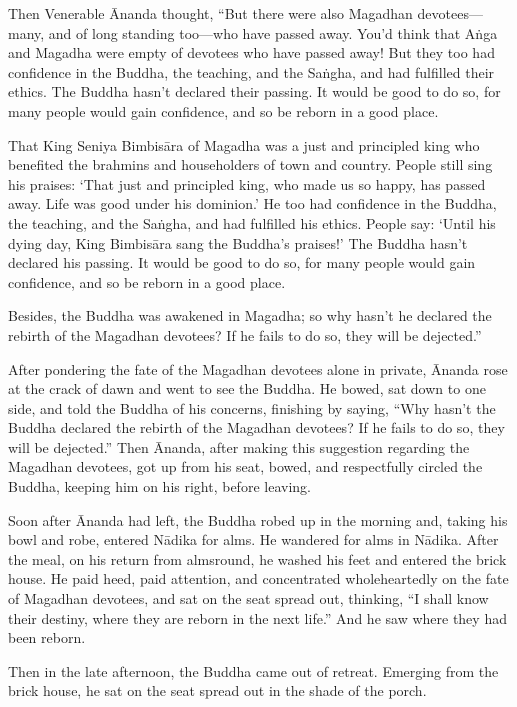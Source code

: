 \documentclass[12pt,openany]{book}%
\begin{document}
Then Venerable Ānanda thought, “But there were also Magadhan devotees—many, and of long standing too—who have passed away. You’d think that \textsanskrit{Aṅga} and Magadha were empty of devotees who have passed away! But they too had confidence in the Buddha, the teaching, and the \textsanskrit{Saṅgha}, and had fulfilled their ethics. The Buddha hasn’t declared their passing. It would be good to do so, for many people would gain confidence, and so be reborn in a good place. 

That King Seniya \textsanskrit{Bimbisāra} of Magadha was a just and principled king who benefited the brahmins and householders of town and country. People still sing his praises: ‘That just and principled king, who made us so happy, has passed away. Life was good under his dominion.’ He too had confidence in the Buddha, the teaching, and the \textsanskrit{Saṅgha}, and had fulfilled his ethics. People say: ‘Until his dying day, King \textsanskrit{Bimbisāra} sang the Buddha’s praises!’ The Buddha hasn’t declared his passing. It would be good to do so, for many people would gain confidence, and so be reborn in a good place. 

Besides, the Buddha was awakened in Magadha; so why hasn’t he declared the rebirth of the Magadhan devotees? If he fails to do so, they will be dejected.” 

After pondering the fate of the Magadhan devotees alone in private, Ānanda rose at the crack of dawn and went to see the Buddha. He bowed, sat down to one side, and told the Buddha of his concerns, finishing by saying, “Why hasn’t the Buddha declared the rebirth of the Magadhan devotees? If he fails to do so, they will be dejected.” Then Ānanda, after making this suggestion regarding the Magadhan devotees, got up from his seat, bowed, and respectfully circled the Buddha, keeping him on his right, before leaving. 

Soon after Ānanda had left, the Buddha robed up in the morning and, taking his bowl and robe, entered \textsanskrit{Nādika} for alms. He wandered for alms in \textsanskrit{Nādika}. After the meal, on his return from almsround, he washed his feet and entered the brick house. He paid heed, paid attention, and concentrated wholeheartedly on the fate of Magadhan devotees, and sat on the seat spread out, thinking, “I shall know their destiny, where they are reborn in the next life.” And he saw where they had been reborn. 

Then in the late afternoon, the Buddha came out of retreat. Emerging from the brick house, he sat on the seat spread out in the shade of the porch. 
\end{document}
